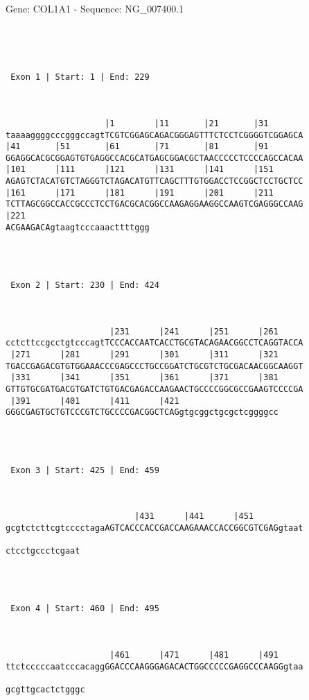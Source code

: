 \documentclass{article}
\begin{document}
\begin{center}
\begin{large}
 Gene: COL1A1 - Sequence: NG\_007400.1
\end{large}
\end{center}
 \begin{Verbatim}




 Exon 1 | Start: 1 | End: 229 



                    |1        |11       |21       |31       
taaaaggggcccgggccagtTCGTCGGAGCAGACGGGAGTTTCTCCTCGGGGTCGGAGCA
|41       |51       |61       |71       |81       |91       
GGAGGCACGCGGAGTGTGAGGCCACGCATGAGCGGACGCTAACCCCCTCCCCAGCCACAA
|101      |111      |121      |131      |141      |151      
AGAGTCTACATGTCTAGGGTCTAGACATGTTCAGCTTTGTGGACCTCCGGCTCCTGCTCC
|161      |171      |181      |191      |201      |211      
TCTTAGCGGCCACCGCCCTCCTGACGCACGGCCAAGAGGAAGGCCAAGTCGAGGGCCAAG
|221                         
ACGAAGACAgtaagtcccaaacttttggg




 Exon 2 | Start: 230 | End: 424 



                     |231      |241      |251      |261     
cctcttccgcctgtcccagtTCCCACCAATCACCTGCGTACAGAACGGCCTCAGGTACCA
 |271      |281      |291      |301      |311      |321     
TGACCGAGACGTGTGGAAACCCGAGCCCTGCCGGATCTGCGTCTGCGACAACGGCAAGGT
 |331      |341      |351      |361      |371      |381     
GTTGTGCGATGACGTGATCTGTGACGAGACCAAGAACTGCCCCGGCGCCGAAGTCCCCGA
 |391      |401      |411      |421                    
GGGCGAGTGCTGTCCCGTCTGCCCCGACGGCTCAGgtgcggctgcgctcggggcc




 Exon 3 | Start: 425 | End: 459 



                          |431      |441      |451          
gcgtctcttcgtcccctagaAGTCACCCACCGACCAAGAAACCACCGGCGTCGAGgtaat
               
ctcctgccctcgaat




 Exon 4 | Start: 460 | End: 495 



                     |461      |471      |481      |491     
ttctcccccaatcccacaggGGACCCAAGGGAGACACTGGCCCCCGAGGCCCAAGGgtaa
                
gcgttgcactctgggc





\end{Verbatim}
\end{document}
